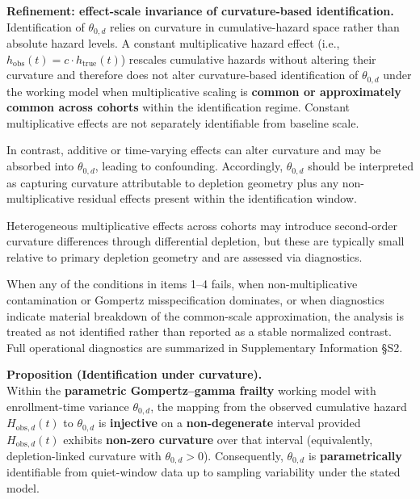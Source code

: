 \documentclass[
]{article}
\renewenvironment{quote}{\begin{mdframed}[style=kcorquote]}{\end{mdframed}}
\begin{document}
\textbf{Refinement: effect-scale invariance of curvature-based
identification.}\\
Identification of \(\theta_{0,d}\) relies on curvature in
cumulative-hazard space rather than absolute hazard levels. A constant
multiplicative hazard effect (i.e.,
\(h_{\mathrm{obs}}(t)=c \cdot h_{\mathrm{true}}(t)\)) rescales
cumulative hazards without altering their curvature and therefore does
not alter curvature-based identification of \(\theta_{0,d}\) under the
working model when multiplicative scaling is \textbf{common or
approximately common across cohorts} within the identification regime.
Constant multiplicative effects are not separately identifiable from
baseline scale.

In contrast, additive or time-varying effects can alter curvature and
may be absorbed into \(\theta_{0,d}\), leading to confounding.
Accordingly, \(\theta_{0,d}\) should be interpreted as capturing
curvature attributable to depletion geometry plus any non-multiplicative
residual effects present within the identification window.

Heterogeneous multiplicative effects across cohorts may introduce
second-order curvature differences through differential depletion, but
these are typically small relative to primary depletion geometry and are
assessed via diagnostics.

When any of the conditions in items 1--4 fails, when non-multiplicative
contamination or Gompertz misspecification dominates, or when
diagnostics indicate material breakdown of the common-scale
approximation, the analysis is treated as not identified rather than
reported as a stable normalized contrast. Full operational diagnostics
are summarized in Supplementary Information §S2.

\begin{quote}
\textbf{Proposition (Identification under curvature).}\\
Within the \textbf{parametric Gompertz--gamma frailty} working model
with enrollment-time variance \(\theta_{0,d}\), the mapping from the
observed cumulative hazard \(H_{\mathrm{obs},d}(t)\) to \(\theta_{0,d}\)
is \textbf{injective} on a \textbf{non-degenerate} interval provided
\(H_{\mathrm{obs},d}(t)\) exhibits \textbf{non-zero curvature} over that
interval (equivalently, depletion-linked curvature with
\(\theta_{0,d}>0\)). Consequently, \(\theta_{0,d}\) is
\textbf{parametrically} identifiable from quiet-window data up to
sampling variability under the stated model.
\end{quote}
\end{document}
